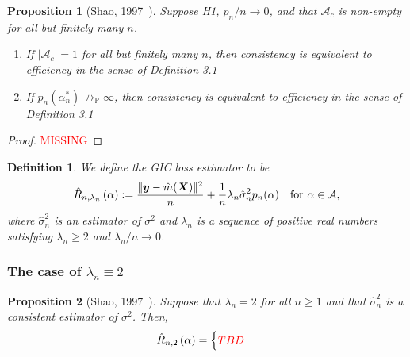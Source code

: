 \documentclass[12pt, letter paper]{article}
\newcommand{\1}{\mathmybb{1}}
\newtheorem{definition}{Definition}[section]
\newtheorem{proposition}{Proposition}[section]
\newcommand{\0}{\emptyset}
\newcommand{\prob}{\mathbb{P}}
\newcommand{\paren}[1]{\left(#1 \right)}
\newcommand{\norm}[1]{|\hspace{-1pt}|#1 |\hspace{-1pt}|}
\newcommand{\normsq}[1]{\norm{#1}^{2}}
\newcommand{\Acal}{\mathcal{A}}
\newcommand{\X}{\boldsymbol{X}}
\newcommand{\y}{\boldsymbol{y}}
\newcommand{\Rhat}[2]{\hat{R}_{n, #1}\paren{#2}}
\newcommand{\sigmahat}{\hat{\sigma}^{2}_{n}}
\begin{document}
\begin{proposition}[Shao, 1997~\cite{shao_1997}]
    Suppose H1, \(p_{n}/n\to 0\), and that \(\Acal_{c}\) is non-empty for all but finitely many \(n\).
    \begin{enumerate}
        \item If \(|\Acal_{c}|=1\) for all but finitely many \(n\), then consistency is equivalent to efficiency in the sense of Definition 3.1
        \item If \(p_{n}(\alpha^{*}_{n})\not\to_{\prob}\infty\), then consistency is equivalent to efficiency in the sense of Definition 3.1
    \end{enumerate}
\end{proposition}
\begin{proof}
    \textcolor{red}{MISSING}
\end{proof}

\begin{definition}
    We define the GIC loss estimator to be
    \[\Rhat{\lambda_{n}}{\alpha} := \frac{\normsq{\y - \hat{m}(\X)}}{n} + \frac{1}{n}\lambda_{n}\sigmahat p_{n}(\alpha)\quad\text{for }\alpha\in\Acal,\]
    where \(\sigmahat\) is an estimator of \(\sigma^{2}\) and \(\lambda_{n}\) is a sequence of positive real numbers satisfying \(\lambda_{n}\geq 2\) and \(\lambda_{n}/n\to 0\).
\end{definition}

\subsubsection{The case of \(\lambda_{n} \equiv 2\)}

\begin{proposition}[Shao, 1997~\cite{shao_1997}]\label{prop:97prop1}
    Suppose that \(\lambda_{n}=2\) for all \(n\geq 1\) and that \(\sigmahat\) is a consistent estimator of \(\sigma^{2}\). Then,
    \[\Rhat{2}{\alpha} = \begin{cases}
        \textcolor{red}{TBD}
    \end{cases}\]
\end{proposition}
\end{document}
